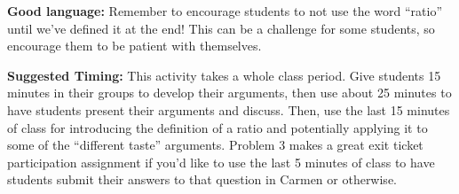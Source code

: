 \documentclass[nooutcomes,noauthor,handout]{ximera}
\begin{document}
\begin{instructorNotes}
{\bf Good language:} Remember to encourage students to not use the word ``ratio'' until we've defined it at the end! This can be a challenge for some students, so encourage them to be patient with themselves.


{\bf Suggested Timing:} This activity takes a whole class period. Give students 15 minutes in their groups to develop their arguments, then use about 25 minutes to have students present their arguments and discuss. Then, use the last 15 minutes of class for introducing the definition of a ratio and potentially applying it to some of the ``different taste'' arguments. Problem 3 makes a great exit ticket participation assignment if you'd like to use the last 5 minutes of class to have students submit their answers to that question in Carmen or otherwise.



\end{instructorNotes}
\end{document}
